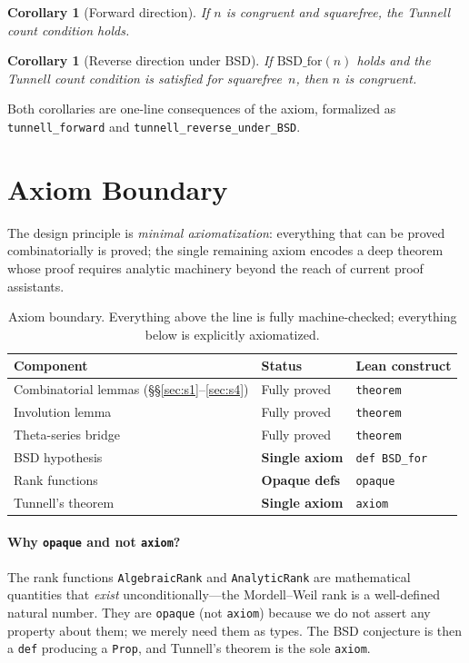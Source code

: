 \documentclass[11pt,a4paper]{article}
\newtheorem{corollary}[theorem]{Corollary}
\theoremstyle{definition}
\newcommand{\lean}[1]{\texttt{#1}}
\newcommand{\BSDfor}{\mathrm{BSD\_for}}
\begin{document}
\begin{corollary}[Forward direction]\label{cor:forward}
If $n$ is congruent and squarefree, the Tunnell count condition holds.
\end{corollary}

\begin{corollary}[Reverse direction under BSD]\label{cor:reverse}
If $\BSDfor(n)$ holds and the Tunnell count condition is satisfied
for squarefree~$n$, then $n$ is congruent.
\end{corollary}

Both corollaries are one-line consequences of the axiom, formalized
as \lean{tunnell\_forward} and \lean{tunnell\_reverse\_under\_BSD}.

\section{Axiom Boundary}\label{sec:boundary}

The design principle is \emph{minimal axiomatization}: everything
that can be proved combinatorially is proved; the single remaining
axiom encodes a deep theorem whose proof requires analytic machinery
beyond the reach of current proof assistants.

\begin{table}[ht]
\centering
\begin{tabular}{@{}lll@{}}
\toprule
\textbf{Component} & \textbf{Status} & \textbf{Lean construct} \\
\midrule
Combinatorial lemmas (\S\S\ref{sec:s1}--\ref{sec:s4})
  & Fully proved & \lean{theorem} \\
Involution lemma
  & Fully proved & \lean{theorem} \\
Theta-series bridge
  & Fully proved & \lean{theorem} \\
BSD hypothesis
  & \textbf{Single axiom} & \lean{def BSD\_for} \\
Rank functions
  & \textbf{Opaque defs} & \lean{opaque} \\
Tunnell's theorem
  & \textbf{Single axiom} & \lean{axiom} \\
\bottomrule
\end{tabular}
\caption{Axiom boundary.  Everything above the line is fully
machine-checked; everything below is explicitly axiomatized.}
\label{tab:boundary}
\end{table}

\paragraph{Why \lean{opaque} and not \lean{axiom}?}
The rank functions \lean{AlgebraicRank} and \lean{AnalyticRank} are
mathematical quantities that \emph{exist} unconditionally---the
Mordell--Weil rank is a well-defined natural number.  They are
\lean{opaque} (not \lean{axiom}) because we do not assert any
property about them; we merely need them as types.  The BSD
conjecture is then a \lean{def} producing a \lean{Prop}, and
Tunnell's theorem is the sole \lean{axiom}.
\end{document}
